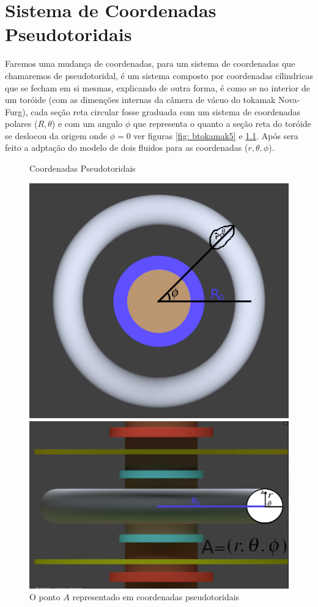 \documentclass[12pt,oneside,a4paper]{abntex2}
\begin{document}
\chapter{Sistema de Coordenadas Pseudotoridais}
Faremos uma mudança de coordenadas, para um sistema de coordenadas que chamaremos de pseudotoridal, é um sistema composto por coordenadas cílindricas que se fecham em si mesmas, explicando de outra forma, é como se no interior de um toróide (com as dimenções internas da câmera de vácuo do tokamak Nova-Furg), cada seção reta circular fosse graduada com um sistema de coordenadas polares ($R,\theta$) e com um angulo $\phi$ que representa o quanto a seção reta do toróide se deslocou da origem onde $\phi=0$ ver figuras \ref{fig: btokamak5} e \ref{fig: btokamak6}. Após sera feito a adptação do modelo de dois fluidos para as coordenadas ($r,\theta,\phi$).
\newpage
\begin{figure}[H]
\centering
\caption{Coordenadas Pseudotoridais}
\label{fig: btokamak5}
\includegraphics[scale=0.7]{pseudotoridal1.png}
\caption{O ponto $A$ representado em coordenadas pseudotoridais} 
\label{fig: btokamak6}
\includegraphics[scale=0.45]{pseudotoridal2.png}    
\end{figure}
\end{document}
